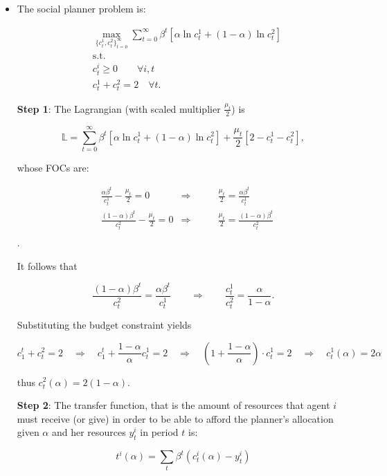 \documentclass[12pt,a4paper]{article}
\begin{document}
\begin{itemize}

  \item The social planner problem is:

    \begin{align*}
      & \max_{\{ c_t^1, c_t^2 \}^{\infty}_{t = 0}} \sum^\infty_{t=0} \beta^t [\alpha \ln c_t^1 + (1-\alpha) \ln c_t^2] \\
      & \text{s.t.} \\
      & c_t^i \geq 0 \qquad \forall i, t \\
      & c^1_t + c^2_t = 2 \quad \forall t.
    \end{align*}

    \textbf{Step 1}: The Lagrangian (with scaled multiplier $\frac{\mu_t}{2}$) is

    $$
      \mathbb{L} = \sum^\infty_{t=0} \beta^t [\alpha \ln c_t^1 + (1-\alpha) \ln c_t^2] + \frac{\mu_t}{2} [2 - c_t^1 - c_t^2],
    $$

    whose FOCs are:

    \begin{align*}
      & \frac{\alpha \beta^t}{c_t^1} - \frac{\mu_t}{2} = 0 & \Rightarrow & \qquad \frac{\mu_t}{2} = \frac{\alpha \beta^t  }{c_t^1} \\
      & \frac{(1 - \alpha) \beta^t}{c_t^2} - \frac{\mu_t}{2} = 0 & \Rightarrow & \qquad \frac{\mu_t}{2} = \frac{(1 - \alpha) \beta^t}{c_t^2} \\
    \end{align*}.

    It follows that

    $$
    \frac{(1 - \alpha)\beta^t}{c_t^2} = \frac{\alpha \beta^t  }{c_t^1} \qquad \Rightarrow \qquad \frac{c_t^1}{c_t^2} = \frac{\alpha}{1 - \alpha}.
    $$

    Substituting the budget constraint yields

    $$
      c_1^t + c_t^2 = 2 \quad \Rightarrow \quad c_1^t + \frac{1 - \alpha}{\alpha} c_t^1 = 2 \quad \Rightarrow \quad \left(1 + \frac{1 - \alpha}{\alpha} \right) \cdot c_t^1 = 2 \quad \Rightarrow \quad c_t^1 (\alpha) = 2 \alpha
    $$

    thus $c_t^2 (\alpha) = 2(1-\alpha)$.

    \textbf{Step 2}: The transfer function, that is the amount of resources that agent $i$ must receive (or give) in order to be able to afford the planner's allocation given $\alpha$ and her resources $y^i_t$ in period $t$ is:

      $$
      t^i(\alpha) = \sum_{t} \beta^t \left( c_t^i(\alpha)- y_t^i \right)
      $$


\end{itemize}
\end{document}
